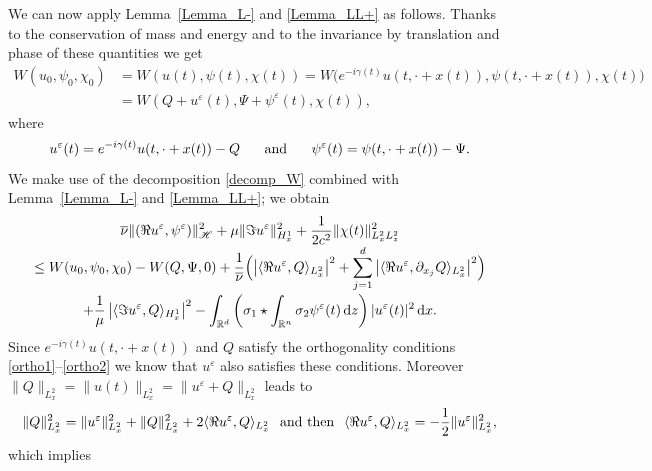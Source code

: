 \documentclass[10pt]{amsart}
\let\bar\oldbar
\theoremstyle{definition}
\let\bar\overline
\newcommand{\R}{\mathbb{R}}
\newcommand{\ud}{\, {\mathrm{d}}}
\begin{document}
We can now apply Lemma~\ref{Lemma_L-} and \ref{Lemma_LL+} as follows. Thanks to the conservation of mass and energy and
to the invariance by translation and phase of these quantities we get\vspace*{-3pt}
\begin{align*}
W(u_{0},\psi_{0},\chi_{0})&=W(u(t),\psi(t),\chi(t))
=W\bigl(e^{-i\gamma(t)}u(t,\cdot+x(t)),\psi(t,\cdot+x(t)),\chi(t)\bigr)\\
&=W(Q+u^{\varepsilon}(t),\Psi+\psi^{\varepsilon}(t),\chi(t)),
\end{align*}
where\vspace*{-5pt}
\[
u^{\varepsilon}(t)=e^{-i\gamma(t)}u(t,\cdot+x(t))-Q\hspace{0.5cm}\text{ and }\hspace{0.5cm}\psi^{\varepsilon}(t)=\psi(t,\cdot+x(t))-\Psi.
\]
We make use of the decomposition \eqref{decomp_W} combined with Lemma~\ref{Lemma_L-} and \ref{Lemma_LL+}; we obtain\vspace*{-5pt}
\begin{multline*}
\bar{\nu}\|(\Re u^{\varepsilon},\psi^{\varepsilon})\|_{\mathscr{H}}^{2}+\mu\|\Im u^{\varepsilon}\|_{H_{x}^{1}}^{2}+\frac{1}{2c^{2}}\|\chi(t)\|_{L_{x}^{2}L_{z}^{2}}^{2}\\[
-3pt]
\leq W(u_{0},\psi_{0},\chi_{0})-W(Q,\Psi,0)+\frac{1}{\bar{\nu}}\Bigl(\left|\langle \Re u^{\varepsilon},Q\rangle_{L_{x}^{2}}\right|^{2}+\sum_{j=1}^{d}\left|\langle \Re u^{\varepsilon},\partial_{x_{j}}Q\rangle_{L_{x}^{2}}\right|^{2}\Bigr)\\[
-2pt]
+\frac{1}{\mu}\left|\langle \Im u^{\varepsilon},Q\rangle_{H_{x}^{1}}\right|^{2}-\int_{\R^{d}}\left(\sigma_{1}\star\int_{\R^{n}}\sigma_{2}\psi^{\varepsilon}(t)\ud z\right)|u^{\varepsilon}(t)|^{2}\ud x.
\end{multline*}
Since $e^{-i\gamma(t)}u(t,\cdot+x(t))$ and $Q$ satisfy the orthogonality conditions \eqref{ortho1}--\eqref{ortho2} we know that $u^{\varepsilon}$ also satisfies these conditions. Moreover $\|Q\|_{L_{x}^{2}}=\|u(t)\|_{L_{x}^{2}}=\|u^{\varepsilon}+Q\|_{L_{x}^{2}}$ leads to\vspace*{-3pt}
\[
\|Q\|_{L_{x}^{2}}^{2}=\|u^{\varepsilon}\|_{L_{x}^{2}}^{2}+\|Q\|_{L_{x}^{2}}^{2}+2\langle\Re u^{\varepsilon},Q\rangle_{L_{x}^{2}} \hspace{0.25cm}\text{and then}\hspace{0.25cm} \langle\Re u^{\varepsilon},Q\rangle_{L_{x}^{2}}=-\frac{1}{2}\|u^{\varepsilon}\|_{L_{x}^{2}}^{2},
\]
which implies\vspace*{-3pt}
\end{document}
